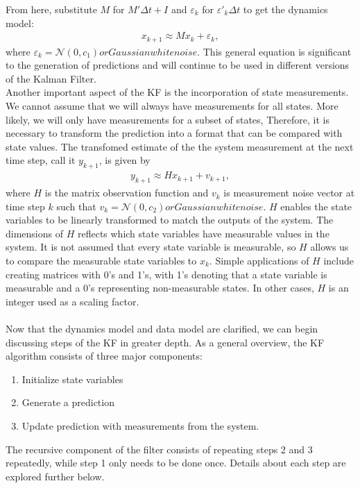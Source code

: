 \noindent From here, substitute $M$ for $M' \Delta t + I$ and $\varepsilon_k$ for  $\varepsilon '_k  \Delta t $ to get the dynamics model:
\begin{align*}
	x_{k+1} \approx M x_k + \varepsilon_k,
\end{align*}
\noindent where $\varepsilon_k = \mathcal{N}(0, c_1) or Gaussian white noise$. This general equation is significant to the generation of predictions and will continue to be used in different versions of the Kalman Filter. \\ 

\noindent Another important aspect of the KF is the incorporation of state measurements. We cannot assume that we will always have measurements for all states. More likely, we will only have measurements for a subset of states, Therefore, it is necessary to transform the prediction into a format that can be compared with state values. The transfomed estimate of the the system measurement at the next time step, call it $y_{k+1}$, is given by 
\begin{align*}
	y_{k+1} \approx H x_{k+1} + v_{k+1},
\end{align*}
where $H$ is the matrix observation function and $v_k$ is measurement noise vector at time step $k$ such that $v_k = \mathcal{N}(0, c_2) or Gaussian white noise$. $H$ enables the state variables to be linearly transformed to match the outputs of the system. The dimensions of $H$ reflects which state variables have measurable values in the system. It is not assumed that every state variable is measurable, so $H$ allows us to compare the measurable state variables to $x_k$. Simple applications of $H$ include creating matrices with 0's and 1's, with 1's denoting that a state variable is measurable and a 0's representing non-measurable states. In other cases, $H$ is an integer used as a scaling factor. \\ \\

\noindent Now that the dynamics model and data model are clarified, we can begin discussing steps of the KF in greater depth. As a general overview, the KF algorithm consists of three major components:
\begin{enumerate}
  \item Initialize state variables
  \item Generate a prediction
  \item Update prediction with measurements from the system.
\end{enumerate}
The recursive component of the filter consists of repeating steps 2 and 3 repeatedly, while step 1 only needs to be done once. Details about each step are explored further below.

